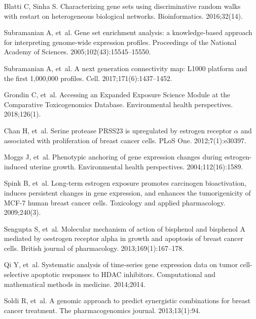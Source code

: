 \documentclass[10pt,letterpaper]{article}
\begin{document}
\begin{thebibliography}{10}
Blatti C, Sinha S.
\newblock Characterizing gene sets using discriminative random walks with
  restart on heterogeneous biological networks.
\newblock Bioinformatics. 2016;32(14).

Subramanian A, et~al.
\newblock Gene set enrichment analysis: a knowledge-based approach for
  interpreting genome-wide expression profiles.
\newblock Proceedings of the National Academy of Sciences.
  2005;102(43):15545--15550.

Subramanian A, et~al.
\newblock A next generation connectivity map: L1000 platform and the first
  1,000,000 profiles.
\newblock Cell. 2017;171(6):1437--1452.

Grondin C, et~al.
\newblock Accessing an Expanded Exposure Science Module at the Comparative
  Toxicogenomics Database.
\newblock Environmental health perspectives. 2018;126(1).

Chan H, et~al.
\newblock Serine protease PRSS23 is upregulated by estrogen receptor $\alpha$
  and associated with proliferation of breast cancer cells.
\newblock PLoS One. 2012;7(1):e30397.

Moggs J, et~al.
\newblock Phenotypic anchoring of gene expression changes during
  estrogen-induced uterine growth.
\newblock Environmental health perspectives. 2004;112(16):1589.

Spink B, et~al.
\newblock Long-term estrogen exposure promotes carcinogen bioactivation,
  induces persistent changes in gene expression, and enhances the
  tumorigenicity of MCF-7 human breast cancer cells.
\newblock Toxicology and applied pharmacology. 2009;240(3).

Sengupta S, et~al.
\newblock Molecular mechanism of action of bisphenol and bisphenol A mediated
  by oestrogen receptor alpha in growth and apoptosis of breast cancer cells.
\newblock British journal of pharmacology. 2013;169(1):167--178.

Qi Y, et~al.
\newblock Systematic analysis of time-series gene expression data on tumor
  cell-selective apoptotic responses to HDAC inhibitors.
\newblock Computational and mathematical methods in medicine. 2014;2014.

Soldi R, et~al.
\newblock A genomic approach to predict synergistic combinations for breast
  cancer treatment.
\newblock The pharmacogenomics journal. 2013;13(1):94.


\end{thebibliography}
\end{document}
